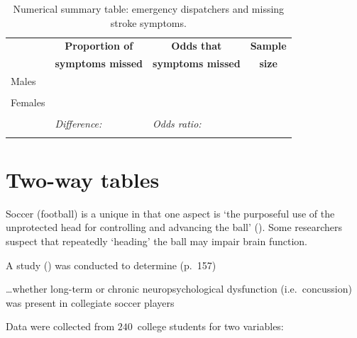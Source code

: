 \documentclass[
  11pt,
  a4paper,
  krantz2]{krantz}
\makeatletter
\renewenvironment{quote}%
{\begin{kframe}}
{\end{kframe}}
\newenvironment{kframe}{%
\medskip{}
\setlength{\fboxsep}{.8em}
 \def\at@end@of@kframe{}%
 \ifinner\ifhmode%
  \def\at@end@of@kframe{\end{minipage}}%
  \begin{minipage}{\columnwidth}%
 \fi\fi%
 \def\FrameCommand##1{\hskip\@totalleftmargin \hskip-\fboxsep
 \colorbox{shadecolor}{##1}\hskip-\fboxsep
     \hskip-\linewidth \hskip-\@totalleftmargin \hskip\columnwidth}%
 \MakeFramed {\advance\hsize-\width
   \@totalleftmargin\z@ \linewidth\hsize
   \@setminipage}}%
 {\par\unskip\endMakeFramed%
 \at@end@of@kframe}
\renewenvironment{quote}
               {\list{}{\vspace{-0.5em}\begin{kframe}\small%
                        \rightmargin   \leftmargin
                        \parsep        \z@ \@plus\p@}%
                \item\relax}
               {\end{kframe}\endlist}
\makeatother
\begin{document}
\begin{table}
\centering
\caption{\label{tab:StrokeSymptomsSummary}Numerical summary table: emergency dispatchers and missing stroke symptoms.}
\centering
\fontsize{10}{12}\selectfont
\begin{tabular}[t]{l|c|c|c}
\hline
\multicolumn{1}{c|}{\textbf{ }} & \multicolumn{1}{c|}{\textbf{Proportion of}} & \multicolumn{1}{c|}{\textbf{Odds that}} & \multicolumn{1}{c}{\textbf{Sample}} \\
\textbf{ } & \textbf{symptoms missed} & \textbf{symptoms missed} & \textbf{size}\\
\hline
Males & \null & \null & \null\\
 
\null & \null & \null & \vphantom{2} \null\\
\hline
Females & \null & \null & \null\\
 
\null & \null & \null & \vphantom{1} \null\\
\hline
\null & \multicolumn{1}{l|}{\em{Difference:\hspace{4cm}\null }} & \multicolumn{1}{l|}{\em{Odds ratio:\hspace{4cm}\null }} & \null\\
 
\null & \null & \null & \null\\
\hline
\end{tabular}
\end{table}

\section{Two-way tables}\label{TwoWayTables}

Soccer (football) is a unique in that one aspect is `the purposeful use of the unprotected head for controlling and advancing the ball' ().
Some researchers suspect that repeatedly `heading' the ball may impair brain function.

A study () was conducted to determine (p.~157)

\begin{quote}
\ldots whether long-term or chronic neuropsychological dysfunction (i.e.~concussion) was present in collegiate soccer players
\end{quote}

Data were collected from \(240\)~college students for two variables:
\end{document}
